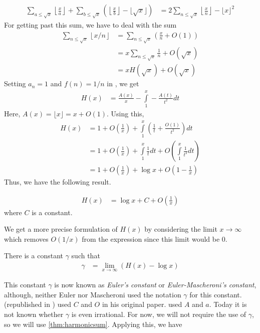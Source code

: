 \documentclass[elemannt.tex]{subfile}
\begin{document}
		\begin{align}
			\sum_{a\leq \sqrt{x}}\left\lfloor{\frac{x}{a}}\right\rfloor+\sum_{b\leq \sqrt{x}}\left(\left\lfloor{\frac{x}{b}}\right\rfloor-\lfloor{\sqrt{x}}\rfloor\right)
				& = 2\sum_{n\leq \sqrt{x}}\left\lfloor{\frac{x}{n}}\right\rfloor-\lfloor{x}\rfloor^{2}\label{eqn:totdiv}
		\end{align}
	For getting past this sum, we have to deal with the sum
		\begin{align*}
			\sum_{n\leq \sqrt{x}}\left\lfloor{x/n}\right\rfloor
				& = \sum_{n\leq \sqrt{x}}\left(\frac{x}{n}+O(1)\right)\\
				& = x\sum_{n\leq \sqrt{x}}\frac{1}{n}+O(\sqrt{x})\\
				& = xH(\sqrt{x})+O(\sqrt{x})
		\end{align*}
	Setting $a_{n}=1$ and $f(n)=1/n$ in , we get
		\begin{align*}
			H(x)
				& = \frac{A(x)}{x}-\int\limits_{1}^{x}-\frac{A(t)}{t^{2}}dt
		\end{align*}
	Here, $A(x)=\lfloor{x}\rfloor=x+O(1)$. Using this,
		\begin{align*}
			H(x)
				& =  1+O\left(\frac{1}{x}\right)+\int\limits_{1}^{x}\left(\frac{1}{t}+\frac{O(1)}{t^{2}}\right)dt\\
				& = 1+O\left(\frac{1}{x}\right)+\int\limits_{1}^{x}\frac{1}{t}dt+O\left(\int\limits_{1}^{x}\frac{1}{t^{2}}dt\right)\\
				& = 1+O\left(\frac{1}{x}\right)+\log{x}+O\left(1-\frac{1}{x}\right)
		\end{align*}
	Thus, we have the following result.
		\begin{theorem}\label{thm:harmonicsum}
				\begin{align*}
					H(x)
						& = \log{x}+C+O\left(\frac{1}{x}\right)
				\end{align*}
			where $C$ is a constant.
		\end{theorem}
	We get a more precise formulation of $H(x)$ by considering the limit $x\to\infty$ which removes $O(1/x)$ from the expression since this limit would be $0$.
		\begin{theorem}
			There is a constant $\gamma$ such that
				\begin{align*}
					\gamma
						& = \lim\limits_{x\to\infty}(H(x)-\log{x})
				\end{align*}
		\end{theorem}
	This constant $\gamma$ is now known as \textit{Euler's constant} or \textit{Euler-Mascheroni's constant}, although, neither Euler nor Mascheroni used the notation $\gamma$ for this constant. \textcite{euler_1740} (republished in \textcite{euler_2020}) used $C$ and $O$ in his original paper. \textcite{mascheroni_1790} used $A$ and $a$. Today it is not known whether $\gamma$ is even irrational. For now, we will not require the use of $\gamma$, so we will use \autoref{thm:harmonicsum}. Applying this, we have
\end{document}
